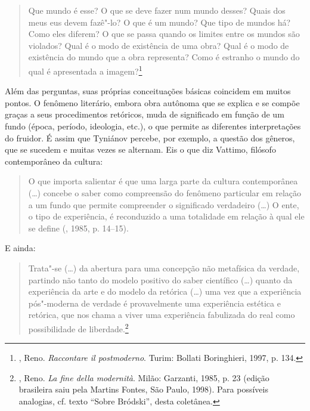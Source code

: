 \begin{quotation}
Que mundo é esse? O que se deve fazer num mundo desses? Quais dos meus
eus devem fazê"-lo? O que é um mundo? Que tipo de mundos há? Como eles
diferem? O que se passa quando os limites entre os mundos são violados?
Qual é o modo de existência de uma obra? Qual é o modo de existência do
mundo que a obra representa? Como é estranho o mundo do qual é
apresentada a imagem?\footnote{, Reno. 
\emph{Raccontare il postmoderno}. Turim: Bollati Boringhieri, 1997,
 p. 134.}
\end{quotation}

Além das perguntas, suas próprias conceituações básicas coincidem em
muitos pontos. O fenômeno literário, embora obra autônoma que se explica
e se compõe graças a seus procedimentos retóricos, muda de
significado em função de um fundo (época, período, ideologia, etc.), o
que permite as diferentes interpretações do fruidor. É assim que
Tyniánov percebe, por exemplo, a questão dos gêneros, que se sucedem e muitas
vezes se alternam. Eis o que diz Vattimo, filósofo contemporâneo da cultura:

\begin{quotation}
O que importa salientar é que uma larga parte da cultura contemporânea
(\ldots{}) concebe o saber como compreensão do fenômeno particular em
relação a um fundo que permite compreender o significado verdadeiro
(\ldots{}) O ente, o tipo de experiência, é reconduzido a uma
totalidade em relação à qual ele se define (, 1985, p. 14--15).
\end{quotation}

E ainda:

\begin{quotation}
Trata"-se (\ldots{}) da abertura para uma concepção não metafísica da
verdade, partindo não tanto do modelo positivo do saber científico
(\ldots{}) quanto da experiência da arte e do modelo da retórica (\ldots{}) uma vez que a experiência pós"-moderna de verdade é
provavelmente uma experiência estética e retórica, que nos chama a viver
uma experiência fabulizada do real como possibilidade de liberdade.\footnote{, Reno. \emph{La fine della modernità}. Milão:
 Garzanti, 1985, p. 23 (edição brasileira saiu pela Martins Fontes,
 São Paulo, 1998). Para possíveis analogias, cf. texto ``Sobre
 Bródski'', desta coletânea.}
\end{quotation}

